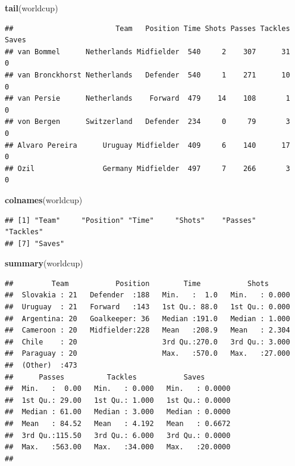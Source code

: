 \documentclass[]{book}
\makeatletter
\newenvironment{Shaded}{\begin{snugshade}}{\end{snugshade}}
\newcommand{\KeywordTok}[1]{\textcolor[rgb]{0.13,0.29,0.53}{\textbf{#1}}}
\newcommand{\NormalTok}[1]{#1}
\newenvironment{kframe}{%
\medskip{}
\setlength{\fboxsep}{.8em}
 \def\at@end@of@kframe{}%
 \ifinner\ifhmode%
  \def\at@end@of@kframe{\end{minipage}}%
  \begin{minipage}{\columnwidth}%
 \fi\fi%
 \def\FrameCommand##1{\hskip\@totalleftmargin \hskip-\fboxsep
 \colorbox{shadecolor}{##1}\hskip-\fboxsep
     \hskip-\linewidth \hskip-\@totalleftmargin \hskip\columnwidth}%
 \MakeFramed {\advance\hsize-\width
   \@totalleftmargin\z@ \linewidth\hsize
   \@setminipage}}%
 {\par\unskip\endMakeFramed%
 \at@end@of@kframe}
\renewenvironment{Shaded}{\begin{kframe}}{\end{kframe}}
\theoremstyle{definition}
\theoremstyle{definition}
\theoremstyle{definition}
\theoremstyle{remark}
\makeatother
\begin{document}
\begin{Shaded}
\begin{Highlighting}[]
\KeywordTok{tail}\NormalTok{(worldcup)}
\end{Highlighting}
\end{Shaded}

\begin{verbatim}
##                        Team   Position Time Shots Passes Tackles Saves
## van Bommel      Netherlands Midfielder  540     2    307      31     0
## van Bronckhorst Netherlands   Defender  540     1    271      10     0
## van Persie      Netherlands    Forward  479    14    108       1     0
## von Bergen      Switzerland   Defender  234     0     79       3     0
## Alvaro Pereira      Uruguay Midfielder  409     6    140      17     0
## Ozil                Germany Midfielder  497     7    266       3     0
\end{verbatim}

\begin{Shaded}
\begin{Highlighting}[]
\KeywordTok{colnames}\NormalTok{(worldcup)}
\end{Highlighting}
\end{Shaded}

\begin{verbatim}
## [1] "Team"     "Position" "Time"     "Shots"    "Passes"   "Tackles" 
## [7] "Saves"
\end{verbatim}

\begin{Shaded}
\begin{Highlighting}[]
\KeywordTok{summary}\NormalTok{(worldcup)}
\end{Highlighting}
\end{Shaded}

\begin{verbatim}
##         Team           Position        Time           Shots       
##  Slovakia : 21   Defender  :188   Min.   :  1.0   Min.   : 0.000  
##  Uruguay  : 21   Forward   :143   1st Qu.: 88.0   1st Qu.: 0.000  
##  Argentina: 20   Goalkeeper: 36   Median :191.0   Median : 1.000  
##  Cameroon : 20   Midfielder:228   Mean   :208.9   Mean   : 2.304  
##  Chile    : 20                    3rd Qu.:270.0   3rd Qu.: 3.000  
##  Paraguay : 20                    Max.   :570.0   Max.   :27.000  
##  (Other)  :473                                                    
##      Passes          Tackles           Saves        
##  Min.   :  0.00   Min.   : 0.000   Min.   : 0.0000  
##  1st Qu.: 29.00   1st Qu.: 1.000   1st Qu.: 0.0000  
##  Median : 61.00   Median : 3.000   Median : 0.0000  
##  Mean   : 84.52   Mean   : 4.192   Mean   : 0.6672  
##  3rd Qu.:115.50   3rd Qu.: 6.000   3rd Qu.: 0.0000  
##  Max.   :563.00   Max.   :34.000   Max.   :20.0000  
## 
\end{verbatim}
\end{document}
